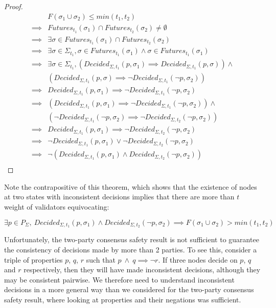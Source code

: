 \begin{proof}
\begin{align}
        &F(\sigma_1\cup\sigma_2) \leq min(t_1, t_2) \\
\implies&Futures_{t_1}(\sigma_1) \cap Futures_{t_2}(\sigma_2) \neq \emptyset \\
\implies&\exists \sigma \in Futures_{t_1}(\sigma_1) \cap Futures_{t_2}(\sigma_2) \\
\implies&\exists \sigma \in \Sigma_{t_1}, \sigma \in Futures_{t_1}(\sigma_1) \land \sigma \in Futures_{t_1}(\sigma_1) \\
\implies&\exists \sigma \in \Sigma_{t_1}, (Decided_{\Sigma, t_1}(p,\sigma_1) \implies Decided_{\Sigma, t_1}(p,\sigma)) \land \\
        &(Decided_{\Sigma, t_1}(p,\sigma) \implies \neg Decided_{\Sigma, t_1}(\neg p,\sigma_2)) \\
\implies&Decided_{\Sigma, t_1}(p,\sigma_1) \implies \neg Decided_{\Sigma, t_1}(\neg p,\sigma_2) \\
\implies&(Decided_{\Sigma, t_1}(p,\sigma_1) \implies \neg Decided_{\Sigma, t_1}(\neg p,\sigma_2)) \land \\
        &(\neg Decided_{\Sigma, t_1}(\neg p,\sigma_2) \implies \neg Decided_{\Sigma, t_2}(\neg p,\sigma_2)) \\
\implies&Decided_{\Sigma, t_1}(p,\sigma_1) \implies \neg Decided_{\Sigma, t_2}(\neg p,\sigma_2) \\
\implies&\neg Decided_{\Sigma, t_1}(p,\sigma_1) \lor \neg Decided_{\Sigma, t_2}(\neg p,\sigma_2) \\
\implies&\neg (Decided_{\Sigma, t_1}(p,\sigma_1) \land Decided_{\Sigma, t_2}(\neg p,\sigma_2)) \\
\end{align}
\end{proof}

Note the contrapositive of this theorem, which shows that the existence of nodes at two states with inconsistent decisions implies that there are more than $t$ weight of validators equivocating:

$$
\exists p \in P_\Sigma,~ Decided_{\Sigma, t_1}(p,\sigma_1) \land Decided_{\Sigma, t_2}(\neg p, \sigma_2) \implies  F(\sigma_1 \cup \sigma_2) > min(t_1, t_2)
$$

Unfortunately, the two-party consensus safety result is not sufficient to guarantee the consistency of decisions made by more than 2 parties. To see this, consider a triple of properties $p$, $q$, $r$ such that $p~ \land~ q \implies \neg r$. If three nodes decide on $p$, $q$ and $r$ respectively, then they will have made inconsistent decisions, although they may be consistent pairwise. We therefore need to understand inconsistent decisions in a more general way than we considered for the two-party consensus safety result, where looking at properties and their negations was sufficient.

